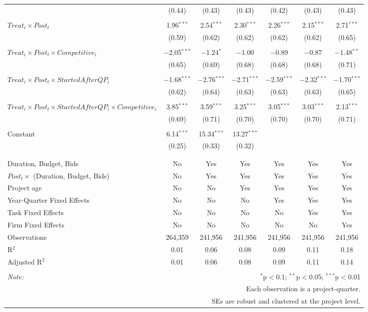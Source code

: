 \documentclass[
]{article}
\begin{document}
\begin{table}[H]
\begin{tabular}{@{\extracolsep{-3pt}}lcccccc}
  & (0.44) & (0.43) & (0.43) & (0.42) & (0.43) & (0.43) \\ 
  & & & & & & \\ 
 $Treat_i \times Post_t$ & 1.96$^{***}$ & 2.54$^{***}$ & 2.30$^{***}$ & 2.26$^{***}$ & 2.15$^{***}$ & 2.71$^{***}$ \\ 
  & (0.59) & (0.62) & (0.62) & (0.62) & (0.62) & (0.65) \\ 
  & & & & & & \\ 
 $Treat_i \times Post_t \times Competitive_i$ & $-$2.05$^{***}$ & $-$1.24$^{*}$ & $-$1.00 & $-$0.89 & $-$0.87 & $-$1.48$^{**}$ \\ 
  & (0.65) & (0.69) & (0.68) & (0.68) & (0.68) & (0.71) \\ 
  & & & & & & \\ 
 $Treat_i \times Post_t \times StartedAfterQP_i$ & $-$1.68$^{***}$ & $-$2.76$^{***}$ & $-$2.71$^{***}$ & $-$2.59$^{***}$ & $-$2.32$^{***}$ & $-$1.70$^{***}$ \\ 
  & (0.62) & (0.64) & (0.63) & (0.63) & (0.63) & (0.65) \\ 
  & & & & & & \\ 
 $Treat_i \times Post_t \times StartedAfterQP_i \times Competitive_i$ & 3.85$^{***}$ & 3.59$^{***}$ & 3.25$^{***}$ & 3.05$^{***}$ & 3.03$^{***}$ & 2.13$^{***}$ \\ 
  & (0.69) & (0.71) & (0.70) & (0.70) & (0.70) & (0.71) \\ 
  & & & & & & \\ 
 Constant & 6.14$^{***}$ & 15.34$^{***}$ & 13.27$^{***}$ &  &  &  \\ 
  & (0.25) & (0.33) & (0.32) &  &  &  \\ 
  & & & & & & \\ 
\hline \\[-1.8ex] 
Duration, Budget, Bids & No & Yes & Yes & Yes & Yes & Yes \\ 
$Post_t \times $  (Duration, Budget, Bids) & No & Yes & Yes & Yes & Yes & Yes \\ 
Project age & No & No & Yes & Yes & Yes & Yes \\ 
Year-Quarter Fixed Effects & No & No & No & Yes & Yes & Yes \\ 
Task Fixed Effects & No & No & No & No & Yes & Yes \\ 
Firm Fixed Effects & No & No & No & No & No & Yes \\ 
Observations & 264,359 & 241,956 & 241,956 & 241,956 & 241,956 & 241,956 \\ 
R$^{2}$ & 0.01 & 0.06 & 0.08 & 0.09 & 0.11 & 0.18 \\ 
Adjusted R$^{2}$ & 0.01 & 0.06 & 0.08 & 0.09 & 0.11 & 0.14 \\ 
\hline 
\hline \\[-1.8ex] 
\textit{Note:}  & \multicolumn{6}{r}{$^{*}$p$<$0.1; $^{**}$p$<$0.05; $^{***}$p$<$0.01} \\ 
 & \multicolumn{6}{r}{Each observation is a project-quarter.} \\ 
 & \multicolumn{6}{r}{SEs are robust and clustered at the project level.} \\ 
\end{tabular} 
\end{table}
\end{document}

